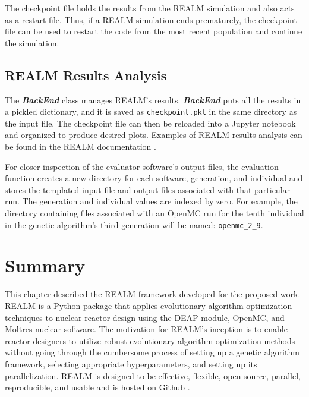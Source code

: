 The checkpoint file holds the results from the REALM simulation and also acts 
as a restart file. 
Thus, if a REALM simulation ends prematurely, the checkpoint file can be used 
to restart the code from the most recent population and continue the simulation. 

\subsection{REALM Results Analysis}
The \textbf{\textit{BackEnd}} class manages REALM's results. 
\textbf{\textit{BackEnd}} puts all the results in a pickled dictionary, and it 
is saved as \texttt{checkpoint.pkl} in the same directory as the input file. 
The checkpoint file can then be reloaded into a Jupyter notebook and organized 
to produce desired plots. 
Examples of REALM results analysis can be found in the REALM documentation 
\cite{chee_arfcrealm_2021}. 

For closer inspection of the evaluator software's output files, the evaluation 
function creates a new directory for each software, generation, and individual 
and stores the templated input file and output files associated with that 
particular run. 
The generation and individual values are indexed by zero. 
For example, the directory containing files associated with an OpenMC run for 
the tenth individual in the genetic algorithm's third generation will be named: 
\texttt{openmc\_2\_9}.




\section{Summary}
This chapter described the \acrfull{REALM} framework developed for the
proposed work. 
\gls{REALM} is a Python package that applies evolutionary algorithm 
optimization techniques to nuclear reactor design using the \acrfull{DEAP} 
module, OpenMC, and Moltres nuclear software. 
The motivation for REALM's inception is to enable reactor designers to utilize 
robust evolutionary algorithm optimization methods without going 
through the cumbersome process of setting up a genetic algorithm framework,
selecting appropriate hyperparameters, and setting up its parallelization. 
REALM is designed to be effective, flexible, open-source, parallel, 
reproducible, and usable and is hosted on Github \cite{chee_arfcrealm_2021}. 